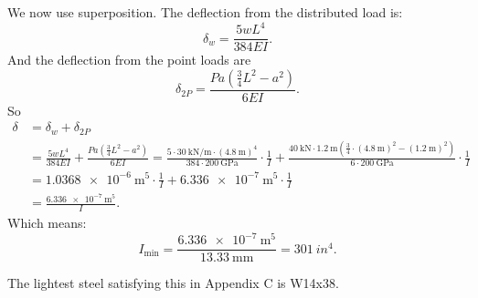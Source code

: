 \begin{derivation}
  We now use superposition.
  The deflection from the distributed load is:
  \begin{equation*}
    \delta_w = \frac{5wL^{4}}{384EI}
  .\end{equation*}
  And the deflection from the point loads are
  \begin{equation*}
    \delta_{2P} = \frac{Pa \left( \frac{3}{4}L^2 - a^2 \right)}{6EI}
  .\end{equation*}
  So
  \begin{align*}
    \delta &= \delta_w + \delta_{2P} \\
           &= \frac{5 w L^{4}}{384 EI} + \frac{Pa \left( \frac{3}{4} L^2 - a^2 \right)}{6EI} = \frac{5 \cdot \qty{30}{\kN\per\m} \cdot \left( \qty{4.8}{\m}  \right)^{4}}{384 \cdot \qty{200}{\GPa}} \cdot \frac{1}{I} + \frac{\qty{40}{\kN} \cdot \qty{1.2}{\m} \left( \frac{3}{4} \cdot \left( \qty{4.8}{\m}  \right)^2 - \left( \qty{1.2}{\m}  \right)^2 \right)}{6\cdot \qty{200}{\GPa} } \cdot \frac{1}{I} \\
           &= \qty{1.0368e-6}{\m^5} \cdot \frac{1}{I} + \qty{6.336e-7}{\m^5} \cdot \frac{1}{I} \\
           &= \frac{\qty{6,336e-7}{\m^{5}}}{I}
  .\end{align*}
  Which means:
  \begin{equation*}
    I_{\mathrm{min}} = \frac{\qty{6,336e-7}{\m^{5}}}{\qty{13,33}{\mm} } = \qty{301}{in ^{4}} 
  .\end{equation*}
  
  The lightest steel satisfying this in Appendix C is W14x38.
\end{derivation}

\newpage
